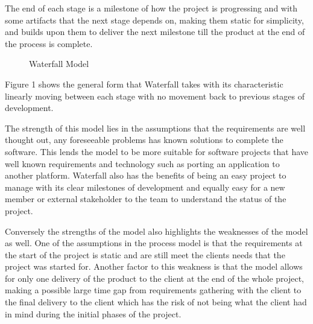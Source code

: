 \documentclass{style/CRPITStyle}
\begin{document}
The end of each stage is a milestone of how the project is progressing and with some artifacts
that the next stage depends on, making them static for simplicity, and builds upon
them to deliver the next milestone till the product at the end of the process is
complete.

\vspace{.1in}

\begin{figure}[htb]
\caption{\protect\label{waterfall}  Waterfall Model}
\end{figure}

\vspace{.1in}

Figure 1 shows the general form that Waterfall takes with its characteristic 
linearly moving between each stage with no movement back to previous stages of
development.

\vspace{.1in}

The strength of this model lies in the assumptions that the requirements are
well thought out, any foreseeable problems has known solutions to complete the
software.
This lends the model to be more suitable for software projects that have well known
requirements and technology such as porting an application to another platform.
Waterfall also has the benefits of being an easy project to manage with its
clear milestones of development and equally easy for a new member or external
stakeholder to the team to understand the status of the project.

\vspace{.1in}

Conversely the strengths of the model also highlights the weaknesses of the model as
well.
One of the assumptions in the process model is that the requirements at the start of the project is
static and are still meet the clients needs that the project was started for.
Another factor to this weakness is that the model allows for only one delivery of the product to
the client at the end of the whole project, making a possible large time gap from requirements 
gathering with the client to the final delivery to the client which has the risk of not being 
what the client had in mind during the initial phases of the project.
\end{document}

